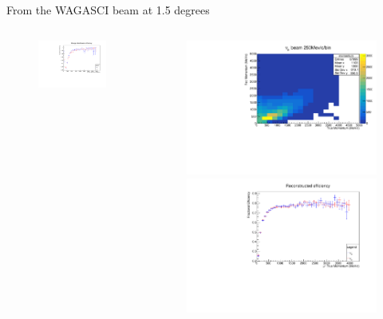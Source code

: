 \documentclass[11pt]{beamer}
\begin{document}
\begin{frame}{From the WAGASCI beam at 1.5 degrees}
\begin{columns}[T]
\begin{column}{.48\textwidth}
\begin{figure}[h!]
			\includegraphics[width=.9\textwidth]{T2K/ChargeIDT2KNeutrinoBeamMIND.pdf}
		\end{figure}
	\end{column}%
	\begin{column}{.48\textwidth}
		\begin{figure}[h!]
			\centering
			\includegraphics[width=.9\textwidth]{T2K/MomentumT2KNeutrinoBeamMIND.pdf}
			
			\includegraphics[width=.9\textwidth]{T2K/FittedT2KNeutrinoBeamMIND.pdf}
		\end{figure}
	\end{column}%
\end{columns}
\end{frame}
\end{document}

